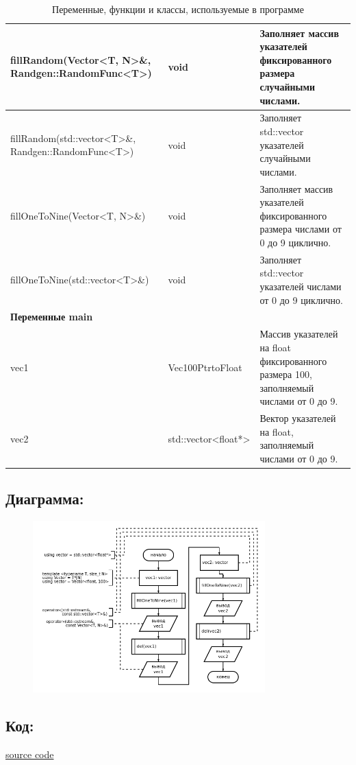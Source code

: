 \documentclass[14pt,a4paper]{article}
\begin{document}
\begin{table}[H]
{\begin{tabular}{|l|l|p{8cm}|}
      fillRandom(Vector<T, N>\&, Randgen::RandomFunc<T>) & void & Заполняет массив указателей фиксированного размера случайными числами. \\ \hline
      fillRandom(std::vector<T>\&, Randgen::RandomFunc<T>) & void & Заполняет std::vector указателей случайными числами. \\ \hline
      fillOneToNine(Vector<T, N>\&) & void & Заполняет массив указателей фиксированного размера числами от 0 до 9 циклично. \\ \hline
      fillOneToNine(std::vector<T>\&) & void & Заполняет std::vector указателей числами от 0 до 9 циклично. \\ \hline
      \multicolumn{3}{|l|}{\textbf{Переменные main}} \\ \hline
      vec1 & Vec100PtrtoFloat & Массив указателей на float фиксированного размера 100, заполняемый числами от 0 до 9. \\ \hline
      vec2 & std::vector<float*> & Вектор указателей на float, заполняемый числами от 0 до 9. \\ \hline
    \end{tabular}
  }
  \caption{Переменные, функции и классы, используемые в программе}
  \label{tabel:1}
\end{table}
\subsection{Диаграмма:}
\begin{figure}[H]
  \centering
  \includegraphics[width=0.8\textwidth]{data/diagram18_2.png}
\end{figure}
\subsection{Код:}

\href{https://raw.githubusercontent.com/John1400800/stuff/refs/heads/main/c_learning/home_works/task18_2.cpp}{source code}
\end{document}
